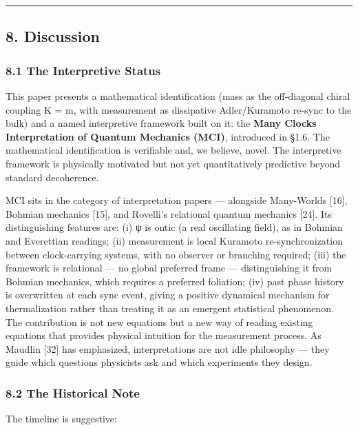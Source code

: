 \documentclass[
]{article}
\begin{document}
\begin{center}\rule{0.5\linewidth}{0.5pt}\end{center}

\subsection{8. Discussion}\label{discussion}

\subsubsection{8.1 The Interpretive
Status}\label{the-interpretive-status}

This paper presents a mathematical identification (mass as the
off-diagonal chiral coupling K = m, with measurement as dissipative
Adler/Kuramoto re-sync to the bulk) and a named interpretive framework
built on it: the \textbf{Many Clocks Interpretation of Quantum Mechanics
(MCI)}, introduced in §1.6. The mathematical identification is
verifiable and, we believe, novel. The interpretive framework is
physically motivated but not yet quantitatively predictive beyond
standard decoherence.

MCI sits in the category of interpretation papers --- alongside
Many-Worlds {[}16{]}, Bohmian mechanics {[}15{]}, and Rovelli's
relational quantum mechanics {[}24{]}. Its distinguishing features are:
(i) ψ is ontic (a real oscillating field), as in Bohmian and Everettian
readings; (ii) measurement is local Kuramoto re-synchronization between
clock-carrying systems, with no observer or branching required; (iii)
the framework is relational --- no global preferred frame ---
distinguishing it from Bohmian mechanics, which requires a preferred
foliation; (iv) past phase history is overwritten at each sync event,
giving a positive dynamical mechanism for thermalization rather than
treating it as an emergent statistical phenomenon. The contribution is
not new equations but a new way of reading existing equations that
provides physical intuition for the measurement process. As Maudlin
{[}32{]} has emphasized, interpretations are not idle philosophy ---
they guide which questions physicists ask and which experiments they
design.

\subsubsection{8.2 The Historical Note}\label{the-historical-note}

The timeline is suggestive:
\end{document}
